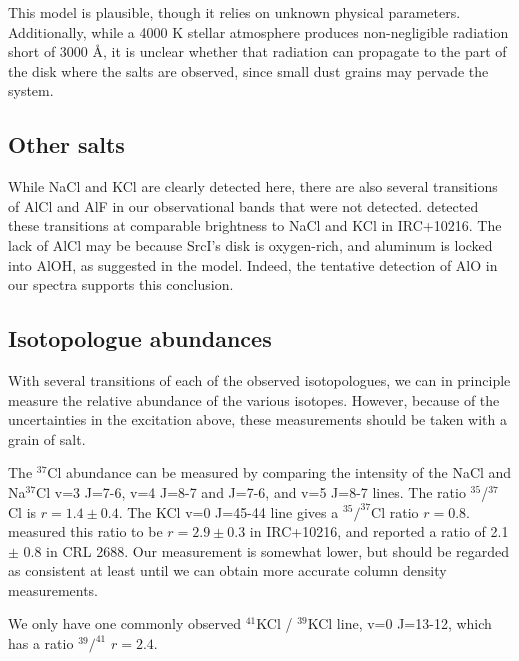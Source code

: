 \documentclass[12pt]{article}
\newcommand{\sourcei}{SrcI\xspace}
\begin{document}
This model is plausible, though it relies on unknown physical parameters.
Additionally, while a 4000 K stellar atmosphere \cite{Testi2010a} produces
non-negligible radiation short of 3000 \AA, it is unclear whether that
radiation can propagate to the part of the disk where the salts are observed,
since small dust grains may pervade the system.


\subsection{Other salts}
While NaCl and KCl are clearly detected here, there are also several transitions of
AlCl and AlF in our observational bands that were not detected.
\cite{Cernicharo1987a} detected these transitions at comparable brightness to NaCl
and KCl in IRC+10216.  The lack of AlCl may be because \sourcei's disk is
oxygen-rich, and aluminum is locked into AlOH, as suggested in the
\cite{Cherchneff2012a} model.  Indeed, the tentative detection of AlO
in our spectra supports this conclusion.



\subsection{Isotopologue abundances}
With several transitions of each of the observed isotopologues, we can in
principle measure the relative abundance of the various isotopes.  However,
because of the uncertainties in the excitation above, these measurements should
be taken with a grain of salt.

The $^{37}$Cl abundance can be measured by comparing the intensity of the NaCl
and Na$^{37}$Cl v=3 J=7-6, v=4 J=8-7 and J=7-6, and v=5 J=8-7 lines.  The ratio
$^{35}$/$^{37}$Cl is $r=1.4\pm0.4$.  The KCl v=0 J=45-44 line gives a
$^{35}/^{37}$Cl ratio $r=0.8$.  \cite{Agundez2012a} measured this ratio to be
$r=2.9\pm0.3$ in IRC+10216, and \cite{Highberger2003a} reported a ratio of 2.1
$\pm$ 0.8 in CRL 2688.  Our measurement is somewhat lower, but should be
regarded as consistent at least until we can obtain more accurate column
density measurements.


We only have one commonly observed $^{41}$KCl / $^{39}$KCl line, v=0 J=13-12,
which has a ratio $^{39}/^{41}$ $r=2.4$. 
\end{document}
